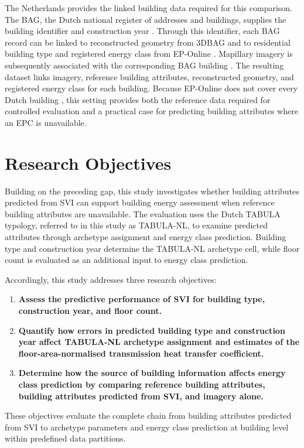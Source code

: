 The Netherlands provides the linked building data required for this comparison. The \ac{BAG}, the Dutch national register of addresses and buildings, supplies the building identifier and construction year \parencite{kadasterbag}. Through this identifier, each BAG record can be linked to reconstructed geometry from 3DBAG \parencite{threedbagdocs,peters2022,dukai2021} and to residential building type and registered energy class from EP-Online \parencite{rvoeponline}. Mapillary imagery is subsequently associated with the corresponding BAG building \parencite{mapillary}. The resulting dataset links imagery, reference building attributes, reconstructed geometry, and registered energy class for each building. Because EP-Online does not cover every Dutch building \parencite{hettinga2023}, this setting provides both the reference data required for controlled evaluation and a practical case for predicting building attributes where an \ac{EPC} is unavailable.

\section{Research Objectives}
\label{sec:research_objectives}

Building on the preceding gap, this study investigates whether building attributes predicted from \ac{SVI} can support building energy assessment when reference building attributes are unavailable. The evaluation uses the Dutch \ac{TABULA} typology, referred to in this study as TABULA-NL, to examine predicted attributes through archetype assignment and energy class prediction. Building type and construction year determine the TABULA-NL archetype cell, while floor count is evaluated as an additional input to energy class prediction.

Accordingly, this study addresses three research objectives:

\begin{enumerate}
	\item \textbf{Assess the predictive performance of \ac{SVI} for building type, construction year, and floor count.}

	\item \textbf{Quantify how errors in predicted building type and construction year affect TABULA-NL archetype assignment and estimates of the floor-area-normalised transmission heat transfer coefficient.}

	\item \textbf{Determine how the source of building information affects energy class prediction by comparing reference building attributes, building attributes predicted from \ac{SVI}, and imagery alone.}
\end{enumerate}

These objectives evaluate the complete chain from building attributes predicted from \ac{SVI} to archetype parameters and energy class prediction at building level within predefined data partitions.
